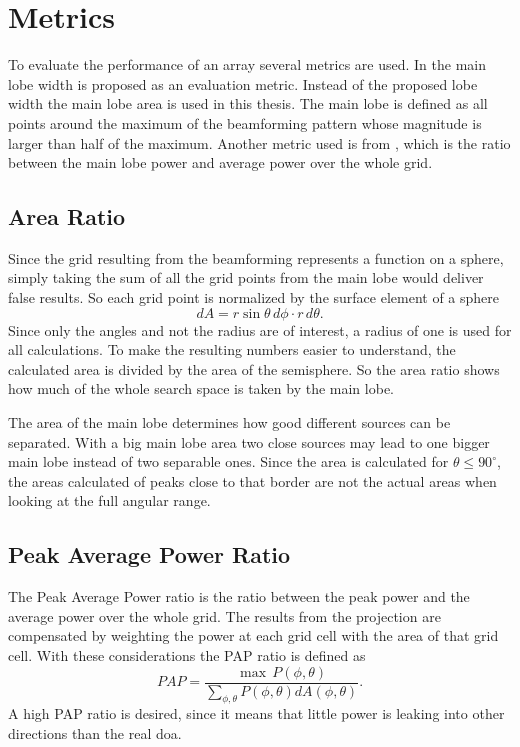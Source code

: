 \newpage
\section{Metrics}
\label{sec:metrics}
To evaluate the performance of an array several metrics are used.
In \cite{Amaral} the main lobe width is proposed as an evaluation metric.
Instead of the proposed lobe width the main lobe area is
used in this thesis.
The main lobe is defined as all points around the maximum of the
beamforming pattern whose magnitude is larger than half of the maximum.
Another metric used is from \cite{GuiAhmad}, which is the ratio
between the main lobe power and average power over the whole grid.


\subsection{Area Ratio}
Since the grid resulting from the beamforming represents a function on a sphere,
simply taking the sum of all the grid points from the main lobe
would deliver false results.
So each grid point is normalized by the surface element of a sphere
\begin{equation}
	dA = r \sin\theta \, d\phi \cdot r\,d\theta.
\end{equation}
Since only the angles and not the radius are of interest, a radius of one is used for all
calculations.
To make the resulting numbers easier to understand, the calculated area is divided
by the area of the semisphere.
So the area ratio shows how much of the whole search space is taken by the main lobe.

The area of the main lobe determines how good different sources can be separated.
With a big main lobe area two close sources may lead to one bigger main lobe instead
of two separable ones.
Since the area is calculated for $\theta \leq 90^\circ$, the areas calculated
of peaks close to that border are not the actual areas when looking at the
full angular range.


\subsection{Peak Average Power Ratio}
The Peak Average Power ratio is the ratio between the peak power and
the average power over the whole grid.
The results from the projection are compensated by weighting
the power at each grid cell with the area of that grid cell.
With these considerations the PAP ratio is defined as
\begin{equation}
	PAP = \frac{\max \, P(\phi, \theta)}{\sum_{\phi, \theta}^{} P(\phi, \theta) dA(\phi, \theta)}.
\end{equation}
A high PAP ratio is desired, since it means that little power is leaking
into other directions than the real \acrshort{doa}.


